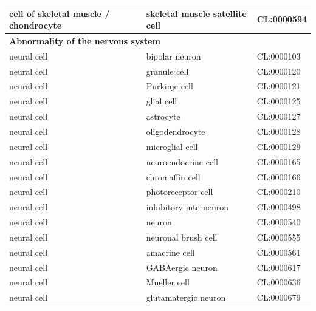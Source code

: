 \documentclass[
]{article}
\begin{document}
\begin{table}
{\begin{tabular}[t]{l|l|l}
\hline
\hspace{1em}cell of skeletal muscle / chondrocyte & skeletal muscle satellite cell & CL:0000594\\
\hline
\multicolumn{3}{l}{\textbf{Abnormality of the nervous system}}\\
\hline
\hspace{1em}neural cell & bipolar neuron & CL:0000103\\
\hline
\hspace{1em}neural cell & granule cell & CL:0000120\\
\hline
\hspace{1em}neural cell & Purkinje cell & CL:0000121\\
\hline
\hspace{1em}neural cell & glial cell & CL:0000125\\
\hline
\hspace{1em}neural cell & astrocyte & CL:0000127\\
\hline
\hspace{1em}neural cell & oligodendrocyte & CL:0000128\\
\hline
\hspace{1em}neural cell & microglial cell & CL:0000129\\
\hline
\hspace{1em}neural cell & neuroendocrine cell & CL:0000165\\
\hline
\hspace{1em}neural cell & chromaffin cell & CL:0000166\\
\hline
\hspace{1em}neural cell & photoreceptor cell & CL:0000210\\
\hline
\hspace{1em}neural cell & inhibitory interneuron & CL:0000498\\
\hline
\hspace{1em}neural cell & neuron & CL:0000540\\
\hline
\hspace{1em}neural cell & neuronal brush cell & CL:0000555\\
\hline
\hspace{1em}neural cell & amacrine cell & CL:0000561\\
\hline
\hspace{1em}neural cell & GABAergic neuron & CL:0000617\\
\hline
\hspace{1em}neural cell & Mueller cell & CL:0000636\\
\hline
\hspace{1em}neural cell & glutamatergic neuron & CL:0000679\\

\end{tabular}}
\end{table}
\end{document}
